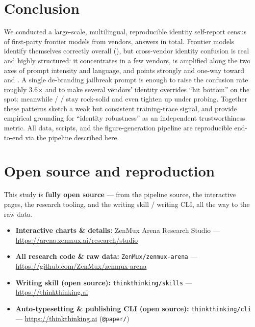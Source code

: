 \documentclass[11pt]{article}
\begin{document}
\section{Conclusion}\label{sec:conclusion}

We conducted a large-scale, multilingual, reproducible identity self-report census of
\statModels{} first-party frontier models from \statVendors{} vendors, \statTotal{} answers in
total. Frontier models identify themselves correctly overall (\pc{\statSelf}), but
cross-vendor identity confusion is real and highly structured: it concentrates in a few
vendors, is amplified along the two axes of prompt intensity and language, and points
strongly and one-way toward  and . A single de-branding jailbreak
prompt is enough to raise the confusion rate roughly 3.6$\times$ and to make several vendors'
identity overrides ``hit bottom'' on the spot; meanwhile  /  /
 stay rock-solid and even tighten up under probing. Together these patterns sketch
a weak but consistent training-trace signal, and provide empirical grounding for ``identity
robustness'' as an independent trustworthiness metric. All data, scripts, and the
figure-generation pipeline are reproducible end-to-end via the pipeline described here.

\section{Open source and reproduction}\label{sec:opensource}

This study is \textbf{fully open source} --- from the pipeline source, the interactive pages,
the research tooling, and the writing skill / writing CLI, all the way to the raw data.

\begin{itemize}
  \item \textbf{Interactive charts \& details:} ZenMux Arena Research Studio ---
  \url{https://arena.zenmux.ai/research/studio}
  \item \textbf{All research code \& raw data:} \texttt{ZenMux/zenmux-arena} ---
  \url{https://github.com/ZenMux/zenmux-arena}
  \item \textbf{Writing skill (open source):} \texttt{thinkthinking/skills} ---
  \url{https://thinkthinking.ai}
  \item \textbf{Auto-typesetting \& publishing CLI (open source):} \texttt{thinkthinking/cli}
  --- \url{https://thinkthinking.ai} (\texttt{@paper/})
\end{itemize}
\end{document}
